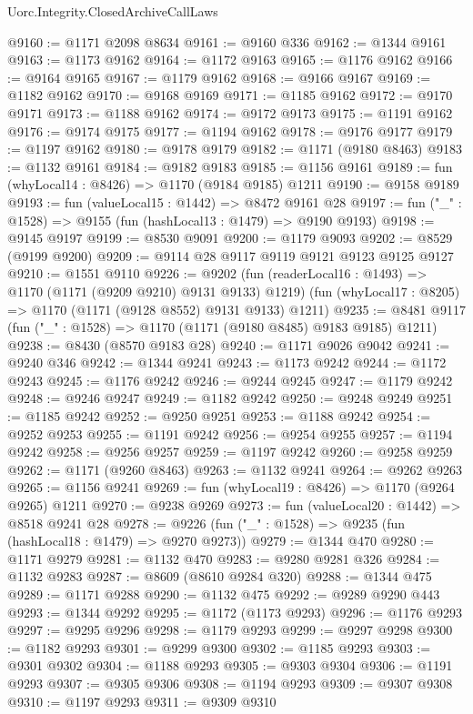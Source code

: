 \begin{lexlean}{Uorc.Integrity.ClosedArchiveCallLaws}
\begin{coremodule}
@9160 := @1171 @2098 @8634
@9161 := @9160 @336
@9162 := @1344 @9161
@9163 := @1173 @9162
@9164 := @1172 @9163
@9165 := @1176 @9162
@9166 := @9164 @9165
@9167 := @1179 @9162
@9168 := @9166 @9167
@9169 := @1182 @9162
@9170 := @9168 @9169
@9171 := @1185 @9162
@9172 := @9170 @9171
@9173 := @1188 @9162
@9174 := @9172 @9173
@9175 := @1191 @9162
@9176 := @9174 @9175
@9177 := @1194 @9162
@9178 := @9176 @9177
@9179 := @1197 @9162
@9180 := @9178 @9179
@9182 := @1171 (@9180 @8463)
@9183 := @1132 @9161
@9184 := @9182 @9183
@9185 := @1156 @9161
@9189 := fun (whyLocal14 : @8426) => @1170 (@9184 @9185) @1211
@9190 := @9158 @9189
@9193 := fun (valueLocal15 : @1442) => @8472 @9161 @28
@9197 := fun ("_" : @1528) => @9155 (fun (hashLocal13 : @1479) => @9190 @9193)
@9198 := @9145 @9197
@9199 := @8530 @9091
@9200 := @1179 @9093
@9202 := @8529 (@9199 @9200)
@9209 := @9114 @28 @9117 @9119 @9121 @9123 @9125 @9127
@9210 := @1551 @9110
@9226 := @9202
    (fun (readerLocal16 : @1493) => @1170 (@1171 (@9209 @9210) @9131 @9133) @1219)
    (fun (whyLocal17 : @8205) => @1170 (@1171 (@9128 @8552) @9131 @9133) @1211)
@9235 := @8481 @9117 (fun ("_" : @1528) => @1170 (@1171 (@9180 @8485) @9183 @9185) @1211)
@9238 := @8430 (@8570 @9183 @28)
@9240 := @1171 @9026 @9042
@9241 := @9240 @346
@9242 := @1344 @9241
@9243 := @1173 @9242
@9244 := @1172 @9243
@9245 := @1176 @9242
@9246 := @9244 @9245
@9247 := @1179 @9242
@9248 := @9246 @9247
@9249 := @1182 @9242
@9250 := @9248 @9249
@9251 := @1185 @9242
@9252 := @9250 @9251
@9253 := @1188 @9242
@9254 := @9252 @9253
@9255 := @1191 @9242
@9256 := @9254 @9255
@9257 := @1194 @9242
@9258 := @9256 @9257
@9259 := @1197 @9242
@9260 := @9258 @9259
@9262 := @1171 (@9260 @8463)
@9263 := @1132 @9241
@9264 := @9262 @9263
@9265 := @1156 @9241
@9269 := fun (whyLocal19 : @8426) => @1170 (@9264 @9265) @1211
@9270 := @9238 @9269
@9273 := fun (valueLocal20 : @1442) => @8518 @9241 @28
@9278 := @9226 (fun ("_" : @1528) => @9235 (fun (hashLocal18 : @1479) => @9270 @9273))
@9279 := @1344 @470
@9280 := @1171 @9279
@9281 := @1132 @470
@9283 := @9280 @9281 @326
@9284 := @1132 @9283
@9287 := @8609 (@8610 @9284 @320)
@9288 := @1344 @475
@9289 := @1171 @9288
@9290 := @1132 @475
@9292 := @9289 @9290 @443
@9293 := @1344 @9292
@9295 := @1172 (@1173 @9293)
@9296 := @1176 @9293
@9297 := @9295 @9296
@9298 := @1179 @9293
@9299 := @9297 @9298
@9300 := @1182 @9293
@9301 := @9299 @9300
@9302 := @1185 @9293
@9303 := @9301 @9302
@9304 := @1188 @9293
@9305 := @9303 @9304
@9306 := @1191 @9293
@9307 := @9305 @9306
@9308 := @1194 @9293
@9309 := @9307 @9308
@9310 := @1197 @9293
@9311 := @9309 @9310

\end{coremodule}
\end{lexlean}
